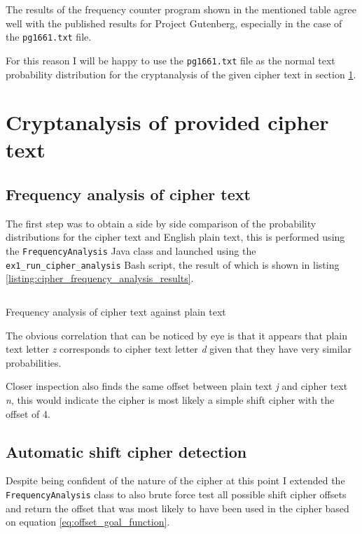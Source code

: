\documentclass[a4paper]{article}
\begin{document}
The results of the frequency counter program shown in the mentioned table agree
well with the published results for Project Gutenberg, especially in the case of
the \texttt{pg1661.txt} file.

For this reason I will be happy to use the \texttt{pg1661.txt} file as the
normal text probability distribution for the cryptanalysis of the given
cipher text in section \ref{sec:cryptanalysis}.

\section{Cryptanalysis of provided cipher text}
\label{sec:cryptanalysis}

\subsection{Frequency analysis of cipher text}

The first step was to obtain a side by side comparison of the probability
distributions for the cipher text and English plain text, this is performed
using the \texttt{FrequencyAnalysis} Java class and launched using the
\texttt{ex1\_run\_cipher\_analysis} Bash script, the result of which is shown in
listing \ref{listing:cipher_frequency_analysis_results}.

\begin{listing}
  \inputminted[frame=lines,fontsize=\scriptsize]{text}{listings/ex1_cryptanalysis_1.txt}
  \caption{Frequency analysis of cipher text against plain text}
  \label{listing:cipher_frequency_analysis_results}
\end{listing}

The obvious correlation that can be noticed by eye is that it appears that
plain text letter \textit{z} corresponds to cipher text letter \textit{d} given
that they have very similar probabilities.

Closer inspection also finds the same offset between plain text \textit{j} and
cipher text \textit{n}, this would indicate the cipher is most likely a simple
shift cipher with the offset of 4.

\subsection{Automatic shift cipher detection}

Despite being confident of the nature of the cipher at this point I extended the
\texttt{FrequencyAnalysis} class to also brute force test all possible shift
cipher offsets and return the offset that was most likely to have been used in
the cipher based on equation \ref{eq:offset_goal_function}.
\end{document}
